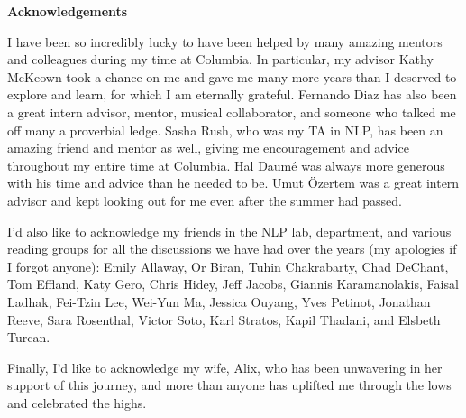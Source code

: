 
\clearpage
\begin{center}

\vspace*{5\baselineskip}
\textbf{\large Acknowledgements}
\end{center}

I have been so incredibly lucky to have been helped by many amazing mentors and colleagues during my time at Columbia.
In particular, my advisor Kathy McKeown took a chance on me and gave me many more years than I deserved to explore and learn, for which I am eternally grateful.
Fernando Diaz has also been a great intern advisor, mentor, musical collaborator, and someone who talked me off many a proverbial ledge.   
Sasha Rush, who was my TA in NLP, has been an amazing friend and mentor as well, giving me encouragement and advice throughout my entire time at Columbia.
Hal Daum{\'e} was always more generous with his time and advice than he needed to be.
Umut {\"O}zertem was a great intern advisor and kept looking out for me even after the summer had passed.

I'd also like to acknowledge my friends in the NLP lab, department, and various reading groups for all the discussions we have had over the years 
(my apologies if I forgot anyone): 
Emily Allaway,
Or Biran, 
Tuhin Chakrabarty, 
Chad DeChant,
Tom Effland, 
Katy Gero, 
Chris Hidey,
Jeff Jacobs,
Giannis Karamanolakis,
Faisal Ladhak,
Fei-Tzin Lee,
Wei-Yun Ma,
Jessica Ouyang,
Yves Petinot,
Jonathan Reeve,
Sara Rosenthal,
Victor Soto, 
Karl Stratos,
Kapil Thadani,
and
Elsbeth Turcan.

Finally, I'd like to acknowledge my wife, Alix, who has been unwavering in her support of this journey, and more than anyone has uplifted  me through the lows and celebrated the highs.


\begin{flushleft}
\hspace{10mm}
\end{flushleft}
\clearpage



